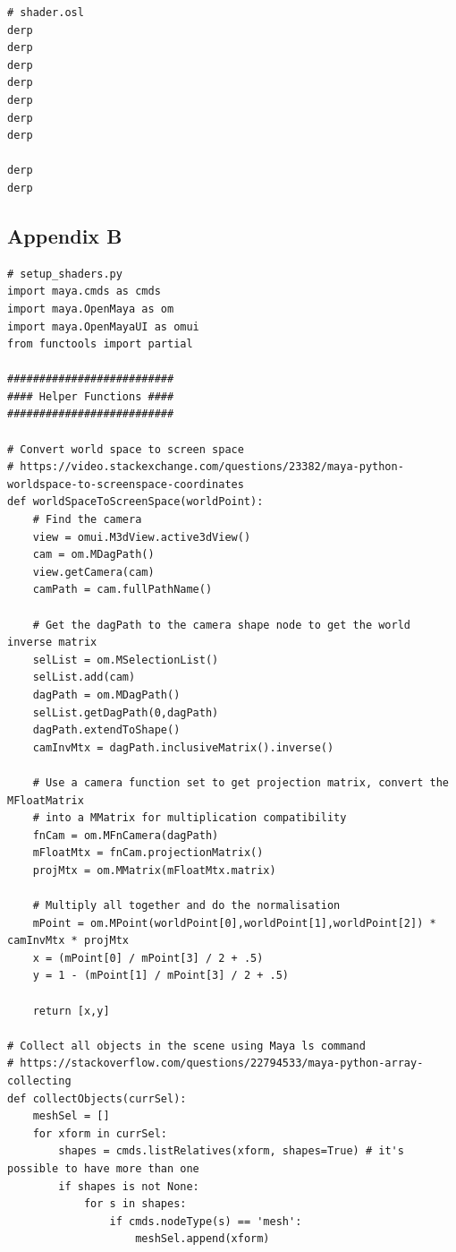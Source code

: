 \documentclass[conference]{IEEEtran}
\begin{document}
\footnotesize{
\begin{verbatim}
# shader.osl
derp
derp
derp
derp
derp
derp
derp

derp
derp
\end{verbatim}

\bigskip

\begin{center}
\section*{Appendix B}
\label{app:b}
\end{center}

\footnotesize{
\begin{verbatim}
# setup_shaders.py
import maya.cmds as cmds
import maya.OpenMaya as om
import maya.OpenMayaUI as omui
from functools import partial

##########################
#### Helper Functions ####
##########################

# Convert world space to screen space
# https://video.stackexchange.com/questions/23382/maya-python-worldspace-to-screenspace-coordinates
def worldSpaceToScreenSpace(worldPoint):
    # Find the camera
    view = omui.M3dView.active3dView()
    cam = om.MDagPath()
    view.getCamera(cam)
    camPath = cam.fullPathName()
    
    # Get the dagPath to the camera shape node to get the world inverse matrix
    selList = om.MSelectionList()
    selList.add(cam)
    dagPath = om.MDagPath()
    selList.getDagPath(0,dagPath)
    dagPath.extendToShape()
    camInvMtx = dagPath.inclusiveMatrix().inverse()

    # Use a camera function set to get projection matrix, convert the MFloatMatrix 
    # into a MMatrix for multiplication compatibility
    fnCam = om.MFnCamera(dagPath)
    mFloatMtx = fnCam.projectionMatrix()
    projMtx = om.MMatrix(mFloatMtx.matrix)

    # Multiply all together and do the normalisation
    mPoint = om.MPoint(worldPoint[0],worldPoint[1],worldPoint[2]) * camInvMtx * projMtx
    x = (mPoint[0] / mPoint[3] / 2 + .5)
    y = 1 - (mPoint[1] / mPoint[3] / 2 + .5)
    
    return [x,y]

# Collect all objects in the scene using Maya ls command
# https://stackoverflow.com/questions/22794533/maya-python-array-collecting
def collectObjects(currSel):
    meshSel = []
    for xform in currSel:
        shapes = cmds.listRelatives(xform, shapes=True) # it's possible to have more than one
        if shapes is not None:
            for s in shapes:
                if cmds.nodeType(s) == 'mesh':
                    meshSel.append(xform)
  

\end{verbatim}}}
\end{document}
